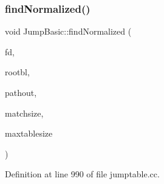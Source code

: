 \subsubsection{\texorpdfstring{findNormalized()}{findNormalized()}}
{\footnotesize\ttfamily void Jump\+Basic\+::find\+Normalized (\begin{DoxyParamCaption}\item[{\mbox{\hyperlink{class_funcdata}{Funcdata}} $\ast$}]{fd,  }\item[{\mbox{\hyperlink{class_block_basic}{Block\+Basic}} $\ast$}]{rootbl,  }\item[{int4}]{pathout,  }\item[{uint4}]{matchsize,  }\item[{uint4}]{maxtablesize }\end{DoxyParamCaption})\hspace{0.3cm}{\ttfamily [protected]}}



Definition at line 990 of file jumptable.\+cc.

